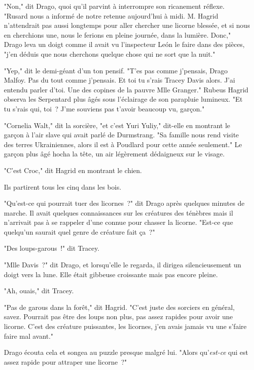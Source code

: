 "Non," dit Drago, quoi qu'il parvint à interrompre son ricanement réflexe. "Rusard nous a informé de notre retenue aujourd'hui à midi. M. Hagrid n'attendrait pas aussi longtemps pour aller chercher une licorne blessée, et si nous en cherchions une, nous le ferions en pleine journée, dans la lumière. Donc," Drago leva un doigt comme il avait vu l'inspecteur León le faire dans des pièces, "j'en déduis que nous cherchons quelque chose qui ne sort que la nuit."

"Yep," dit le demi-géant d'un ton pensif. "T'es pas comme j'pensais, Drago Malfoy. Pas du tout comme j'pensais. Et toi tu s'rais Tracey Davis alors. J'ai entendu parler d'toi. Une des copines de la pauvre Mlle Granger." Rubeus Hagrid observa les Serpentard plus âgés sous l'éclairage de son parapluie lumineux. "Et tu s'rais qui, toi~? J'me souviens pas t'avoir beaucoup vu, garçon."

"Cornelia Walt," dit la sorcière, "et c'est Yuri Yuliy," dit-elle en montrant le garçon à l'air slave qui avait parlé de Durmstrang. "Sa famille nous rend visite des terres Ukrainiennes, alors il est à Poudlard pour cette année seulement." Le garçon plus âgé hocha la tête, un air légèrement dédaigneux sur le visage.

"C'est Croc," dit Hagrid en montrant le chien.

Ils partirent tous les cinq dans les bois.

"Qu'est-ce qui pourrait tuer des licornes~?" dit Drago après quelques minutes de marche. Il avait quelques connaissances sur les créatures des ténèbres mais il n'arrivait pas à se rappeler d'une connue pour chasser la licorne. "Est-ce que quelqu'un saurait quel genre de créature fait ça~?"

"Des loups-garous~!" dit Tracey.

"Mlle Davis~?" dit Drago, et lorsqu'elle le regarda, il dirigea silencieusement un doigt vers la lune. Elle était gibbeuse croissante mais pas encore pleine.

"Ah, ouais," dit Tracey.

"Pas de garous dans la forêt," dit Hagrid. "C'est juste des sorciers en général, savez. Pourrait pas être des loups non plus, pas assez rapides pour avoir une licorne. C'est des créature puissantes, les licornes, j'en avais jamais vu une s'faire faire mal avant."

Drago écouta cela et songea au puzzle presque malgré lui. "Alors qu'\emph{est-ce} qui est assez rapide pour attraper une licorne~?"

